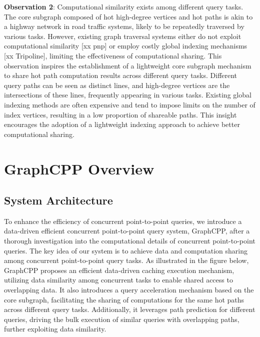 \documentclass[lettersize,journal]{IEEEtran} %
\begin{document}
{\bf{Observation 2}}: Computational similarity exists among different query tasks. The core subgraph composed of hot high-degree vertices and hot paths is akin to a highway network in road traffic systems, likely to be repeatedly traversed by various tasks. However, existing graph traversal systems either do not exploit computational similarity [xx pnp] or employ costly global indexing mechanisms [xx Tripoline], limiting the effectiveness of computational sharing. This observation inspires the establishment of a lightweight core subgraph mechanism to share hot path computation results across different query tasks. Different query paths can be seen as distinct lines, and high-degree vertices are the intersections of these lines, frequently appearing in various tasks. Existing global indexing methods are often expensive and tend to impose limits on the number of index vertices, resulting in a low proportion of shareable paths. This insight encourages the adoption of a lightweight indexing approach to achieve better computational sharing.

\section{GraphCPP Overview}

\subsection{System Architecture}
To enhance the efficiency of concurrent point-to-point queries, we introduce a data-driven efficient concurrent point-to-point query system, GraphCPP, after a thorough investigation into the computational details of concurrent point-to-point queries. The key idea of our system is to achieve data and computation sharing among concurrent point-to-point query tasks. As illustrated in the figure below, GraphCPP proposes an efficient data-driven caching execution mechanism, utilizing data similarity among concurrent tasks to enable shared access to overlapping data. It also introduces a query acceleration mechanism based on the core subgraph, facilitating the sharing of computations for the same hot paths across different query tasks. Additionally, it leverages path prediction for different queries, driving the bulk execution of similar queries with overlapping paths, further exploiting data similarity.
\end{document}
